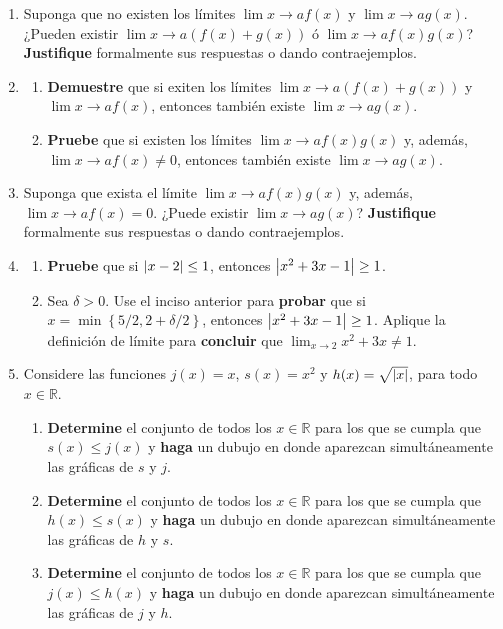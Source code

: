 \documentclass[12pt]{article}
\begin{document}
\begin{enumerate}
    \item Suponga que no existen los límites $\lim{x\rightarrow a}f(x)$ y $\lim{x\rightarrow a}g(x)$. ¿Pueden existir $\lim{x\rightarrow a}(f(x)+g(x))$ ó $\lim{x\rightarrow a}f(x)g(x)$? \textbf{Justifique} formalmente sus respuestas o dando contraejemplos.
    \item \begin{enumerate}
        \item \textbf{Demuestre} que si exiten los límites $\lim{x\rightarrow a}(f(x)+g(x))$ y $\lim{x\rightarrow a}f(x)$, entonces también existe $\lim{x\rightarrow a}g(x)$.
        \item \textbf{Pruebe} que si existen los límites $\lim{x\rightarrow a}f(x)g(x)$ y, además, $\lim{x\rightarrow a}f(x)\neq 0$, entonces también existe $\lim{x\rightarrow a}g(x)$.
    \end{enumerate}
    \item Suponga que exista el límite $\lim{x\rightarrow a}f(x)g(x)$ y, además, $\lim{x\rightarrow a}f(x)=0$. ¿Puede existir $\lim{x\rightarrow a}g(x)$? \textbf{Justifique} formalmente sus respuestas o dando contraejemplos.
    \item \begin{enumerate}
        \item \textbf{Pruebe} que si $\left| x-2 \right|\leq1$, entonces $\left| x^2+3x-1 \right|\geq1$.
        \item Sea $\delta>0$. Use el inciso anterior para \textbf{probar} que si $x=\min\left\{5/2,2+\delta/2 \right\}$, entonces $\left| x^2+3x-1 \right|\geq1$. Aplique la definición de límite para \textbf{concluir} que $\lim_{x\rightarrow2}x^2+3x\neq1$.
    \end{enumerate}
    \item Considere las funciones $j(x)=x$, $s(x)=x^2$ y $h(x)=\sqrt{\left| x \right|}$, para todo $x\in\mathbb{R}$.
    \begin{enumerate}
        \item \textbf{Determine} el conjunto de todos los $x\in\mathbb{R}$ para los que se cumpla que $s(x)\leq j(x)$ y \textbf{haga} un dubujo en donde aparezcan simultáneamente las gráficas de $s$ y $j$.
        \item \textbf{Determine} el conjunto de todos los $x\in\mathbb{R}$ para los que se cumpla que $h(x)\leq s(x)$ y \textbf{haga} un dubujo en donde aparezcan simultáneamente las gráficas de $h$ y $s$.
        \item \textbf{Determine} el conjunto de todos los $x\in\mathbb{R}$ para los que se cumpla que $j(x)\leq h(x)$ y \textbf{haga} un dubujo en donde aparezcan simultáneamente las gráficas de $j$ y $h$.

\end{enumerate}
\end{enumerate}
\end{document}
